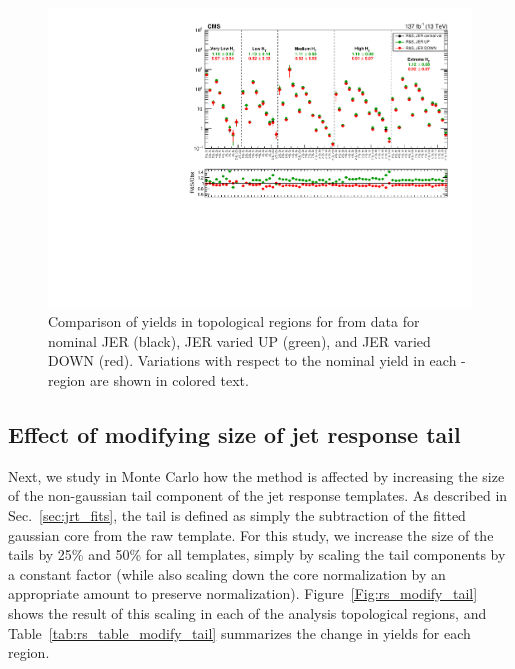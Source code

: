 \begin{figure}[ht]
  \begin{center}
    \includegraphics[width=1.0\textwidth]{figs/qcd/rs_data/data_JER_systVar.pdf}
    \caption{Comparison of yields in topological regions for \rs from data for nominal JER (black), JER varied UP (green), and JER varied DOWN (red). Variations with respect to the nominal yield
      in each \Ht-region are shown in colored text.
            }
    \label{Fig:rs_data_JER_var}
  \end{center}
\end{figure}


\subsection{Effect of modifying size of jet response tail}
\label{sec:rs_jrt_tail}

Next, we study in Monte Carlo how the \rs method is affected by increasing the size of the non-gaussian tail component of the jet response templates.
As described in Sec.~\ref{sec:jrt_fits}, the tail is defined as simply the subtraction of the fitted gaussian core from the raw template.
For this study, we increase the size of the tails by 25\% and 50\% for all templates, simply by scaling the tail components by a constant factor
(while also scaling down the core normalization by an appropriate amount to preserve normalization).
Figure~\ref{Fig:rs_modify_tail} shows the result of this scaling in each of the analysis topological regions, and Table~\ref{tab:rs_table_modify_tail}
summarizes the change in yields for each \Ht region.

